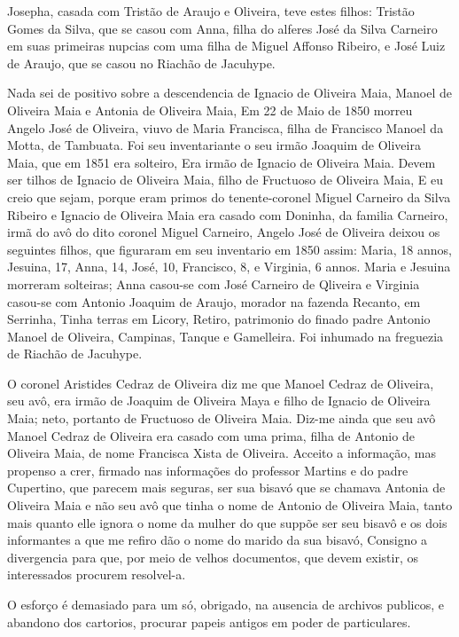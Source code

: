 Josepha, casada com Tristão de Araujo e Oliveira, teve estes filhos: Tristão Gomes da Silva, que se casou com Anna, filha do alferes José da Silva Carneiro em suas primeiras nupcias com uma filha de Miguel Affonso Ribeiro, e José Luiz de Araujo, que se casou no Riachão de Jacuhype.

Nada sei de positivo sobre a descendencia de Ignacio de Oliveira Maia, Manoel de Oliveira Maia e Antonia de Oliveira Maia, Em 22 de Maio de 1850 morreu Angelo José de Oliveira, viuvo de Maria Francisca, filha de Francisco Manoel da Motta, de Tambuata. Foi seu inventariante o seu irmão Joaquim de Oliveira Maia, que em 1851 era solteiro, Era irmão de Ignacio de Oliveira Maia. Devem ser tilhos de Ignacio de Oliveira Maia, filho de Fructuoso de Oliveira Maia, E eu creio que sejam, porque eram primos do tenente-coronel Miguel Carneiro da Silva Ribeiro e Ignacio de Oliveira Maia era casado com Doninha, da familia Carneiro, irmã 
do avô do dito coronel Miguel Carneiro, Angelo José de Oliveira deixou os seguintes filhos, que figuraram em seu inventario em 1850 assim: Maria, 18 annos\label{ma18}, Jesuina, 17, Anna, 14, José, 10, Francisco, 8, e Virginia, 6 annos. Maria e Jesuina morreram solteiras; Anna casou-se com José Carneiro de Qliveira e Virginia casou-se com Antonio Joaquim de Araujo, morador na fazenda Recanto, em Serrinha, Tinha terras em Licory, Retiro, patrimonio do finado padre Antonio Manoel de Oliveira, Campinas, Tanque e
Gamelleira. Foi inhumado na freguezia de Riachão de Jacuhype.

O coronel Aristides Cedraz de Oliveira diz me que Manoel Cedraz de Oliveira, seu avô, era irmão de Joaquim de Oliveira Maya e filho de Ignacio de Oliveira Maia; neto, portanto de Fructuoso de Oliveira Maia. Diz-me ainda que seu avô Manoel Cedraz de Oliveira era casado com uma prima, filha de Antonio de Oliveira Maia, de nome Francisca Xista de Oliveira. Acceito a informação, mas propenso a crer, firmado nas informações do professor Martins e do padre Cupertino, que parecem mais seguras, ser sua bisavó que se chamava Antonia de Oliveira Maia e não seu avô que tinha o nome de Antonio de Oliveira Maia, tanto mais quanto elle ignora o nome da mulher do que suppõe ser seu bisavô e os dois informantes a que me refiro dão o nome do marido da sua bisavó, Consigno a divergencia para que, por meio de velhos documentos, que devem existir, os interessados procurem resolvel-a.

O esforço é demasiado para um só, obrigado, na ausencia de archivos publicos, e abandono dos cartorios, procurar papeis antigos em poder de particulares.

